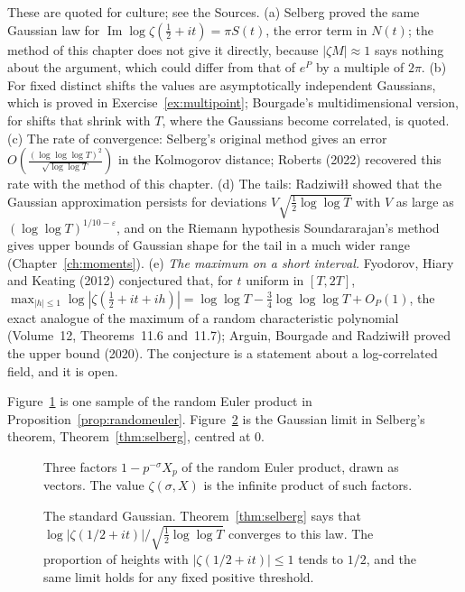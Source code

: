 \begin{remark}
These are quoted for culture; see the Sources. (a) Selberg proved the same Gaussian law for $\operatorname{Im}\log\zeta(\frac12+it)=\pi S(t)$, the error term in $N(t)$; the method of this chapter does not give it directly, because $|\zeta M|\approx1$ says nothing about the argument, which could differ from that of $e^P$ by a multiple of $2\pi$. (b) For fixed distinct shifts the values are asymptotically independent Gaussians, which is proved in Exercise~\ref{ex:multipoint}; Bourgade's multidimensional version, for shifts that shrink with $T$, where the Gaussians become correlated, is quoted. (c) The rate of convergence: Selberg's original method gives an error $O(\frac{(\log\log\log T)^2}{\sqrt{\log\log T}})$ in the Kolmogorov distance; Roberts (2022) recovered this rate with the method of this chapter. (d) The tails: Radziwi\l\l{} showed that the Gaussian approximation persists for deviations $V\sqrt{\frac12\log\log T}$ with $V$ as large as $(\log\log T)^{1/10-\varepsilon}$, and on the Riemann hypothesis Soundararajan's method gives upper bounds of Gaussian shape for the tail in a much wider range (Chapter~\ref{ch:moments}). (e) \emph{The maximum on a short interval.} Fyodorov, Hiary and Keating (2012) conjectured that, for $t$ uniform in $[T,2T]$, $\max_{|h|\le1}\log|\zeta(\frac12+it+ih)|=\log\log T-\frac34\log\log\log T+O_P(1)$, the exact analogue of the maximum of a random characteristic polynomial (Volume~12, Theorems~11.6 and~11.7); Arguin, Bourgade and Radziwi\l\l{} proved the upper bound (2020). The conjecture is a statement about a log-correlated field, and it is open.
\end{remark}

Figure~\ref{fig:v15c11-euler} is one sample of the random Euler product in Proposition~\ref{prop:randomeuler}. Figure~\ref{fig:v15c11-bell} is the Gaussian limit in Selberg's theorem, Theorem~\ref{thm:selberg}, centred at \(0\).

\begin{figure}[ht]
\centering
{}
\caption{Three factors \(1-p^{-\sigma}X_p\) of the random Euler product, drawn as vectors. The value \(\zeta(\sigma,X)\) is the infinite product of such factors.}
\label{fig:v15c11-euler}
\end{figure}

\begin{figure}[ht]
\centering
{}
\caption{The standard Gaussian. Theorem~\ref{thm:selberg} says that \(\log|\zeta(1/2+it)|/\sqrt{\tfrac12\log\log T}\) converges to this law. The proportion of heights with \(|\zeta(1/2+it)|\le1\) tends to \(1/2\), and the same limit holds for any fixed positive threshold.}
\label{fig:v15c11-bell}
\end{figure}
